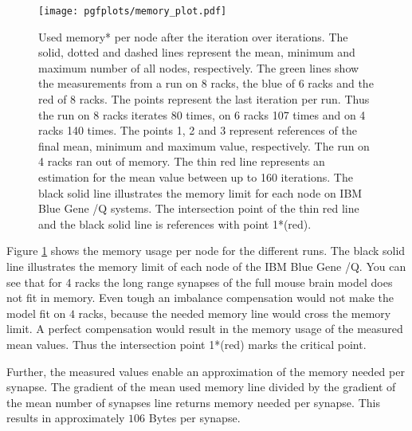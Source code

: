 \begin{figure}[h!]
\begin{center}
 \texttt{[image: pgfplots/memory\_plot.pdf]}
\end{center}
\caption{Used memory* per node after the iteration over iterations.
The solid, dotted and dashed lines represent the mean, minimum and maximum number of all nodes, respectively.
The green lines show the measurements from a run on 8 racks, the blue of 6 racks and the red of 8 racks.
The points represent the last iteration per run. Thus the run on 8 racks iterates 80 times, on 6 racks 107 times and on
4 racks 140 times. The points 1, 2 and 3 represent references of the final mean, minimum and maximum value, respectively.
The run on 4 racks ran out of memory.
The thin red line represents an estimation for the mean value between up to 160 iterations.
The black solid line illustrates the memory limit for each node on IBM Blue Gene /Q systems.
The intersection point of the thin red line and the black solid line is references with point 1*(red).
 }
\label{fig:memoryplot}
\end{figure}
Figure \ref{fig:memoryplot} shows the memory usage per node for the different runs.
The black solid line illustrates the memory limit of each node of the IBM Blue Gene /Q.
You can see that for 4 racks the long range synapses of the full mouse brain model does not fit in memory.
Even tough an imbalance compensation would not make the model fit on $4$ racks,
because the needed memory line would cross the memory limit.
A perfect compensation would result in the memory usage of the measured mean values.
Thus the intersection point 1*(red) marks the critical point.

Further, the measured values enable an approximation of the memory needed per synapse.
The gradient of the mean used memory line divided by the gradient of the mean number of synapses line returns
memory needed per synapse. This results in approximately $106$ Bytes per synapse.





